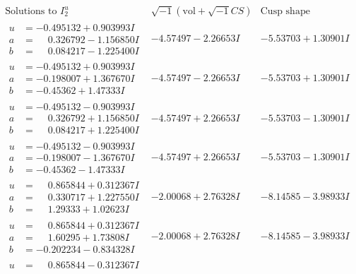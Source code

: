 \documentclass[1p]{elsarticle_modified}
\theoremstyle{definition}
\newcommand{\I}{\sqrt{-1}}
\begin{document}
$$\begin{array}{c|c|c}  
\text{Solutions to }I^u_{2}& \I (\text{vol} + \sqrt{-1}CS) & \text{Cusp shape}\\
 \hline 
\begin{aligned}
u &= -0.495132 + 0.903993 I \\
a &= \phantom{-}0.326792 - 1.156850 I \\
b &= \phantom{-}0.084217 - 1.225400 I\end{aligned}
 & -4.57497 - 2.26653 I & -5.53703 + 1.30901 I \\ \hline\begin{aligned}
u &= -0.495132 + 0.903993 I \\
a &= -0.198007 + 1.367670 I \\
b &= -0.45362 + 1.47333 I\end{aligned}
 & -4.57497 - 2.26653 I & -5.53703 + 1.30901 I \\ \hline\begin{aligned}
u &= -0.495132 - 0.903993 I \\
a &= \phantom{-}0.326792 + 1.156850 I \\
b &= \phantom{-}0.084217 + 1.225400 I\end{aligned}
 & -4.57497 + 2.26653 I & -5.53703 - 1.30901 I \\ \hline\begin{aligned}
u &= -0.495132 - 0.903993 I \\
a &= -0.198007 - 1.367670 I \\
b &= -0.45362 - 1.47333 I\end{aligned}
 & -4.57497 + 2.26653 I & -5.53703 - 1.30901 I \\ \hline\begin{aligned}
u &= \phantom{-}0.865844 + 0.312367 I \\
a &= \phantom{-}0.330717 + 1.227550 I \\
b &= \phantom{-}1.29333 + 1.02623 I\end{aligned}
 & -2.00068 + 2.76328 I & -8.14585 - 3.98933 I \\ \hline\begin{aligned}
u &= \phantom{-}0.865844 + 0.312367 I \\
a &= \phantom{-}1.60295 + 1.73808 I \\
b &= -0.202234 - 0.834328 I\end{aligned}
 & -2.00068 + 2.76328 I & -8.14585 - 3.98933 I \\ \hline\begin{aligned}
u &= \phantom{-}0.865844 - 0.312367 I \\

\end{aligned}
\end{array}$$
\end{document}
